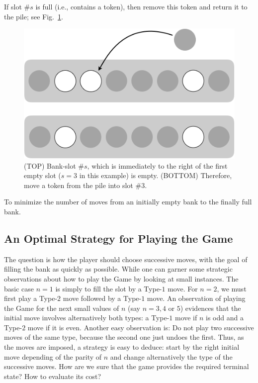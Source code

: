 \begin{enumerate}
If slot \#$s$ is full (i.e., contains a token), then remove this token
and return it to the pile; see Fig.~\ref{fig:rule2}.
\begin{figure}[htb]
\begin{center}
        \includegraphics[scale=0.3]{FiguresMaths/GameTokenRule2.png}
\caption{(TOP) Bank-slot \#$s$, which is immediately to the right of
  the first empty slot ($s=3$ in this example) is empty.  (BOTTOM)
  Therefore, move a token from the pile into slot \#$3$.}
        \label{fig:rule2}
\end{center}
\end{figure}
\end{enumerate}

\medskip

 To minimize the
number of moves from an initially empty bank to the finally full bank.



\subsection{An Optimal Strategy for Playing the Game}
\label{sec:Token-Game-Strategies}

The question is how the player should choose successive moves, 
with the goal of filling the bank as quickly as possible. 
While one can garner some strategic observations about how to play the
Game by looking at small instances.
The basic case $n=1$ is simply to fill the slot by a Type-$1$ move.
For $n=2$, we must first play a Type-$2$ move followed by a Type-$1$ move. 
An observation of playing the Game for the next small values of $n$ (say $n=3, 4$ or $5$)
evidences that the initial move involves alternatively both types: a Type-$1$ move if $n$ is odd
and a Type-$2$ move if it is even. 
Another easy observation is: Do not play
two successive moves of the same type, because the second one just undoes the first.
Thus, as the moves are imposed, a strategy is easy to deduce: 
start by the right initial move depending of the parity of $n$ and change alternatively the type
of the successive moves.
How are we sure that the game provides the required terminal state? How to evaluate its cost?

